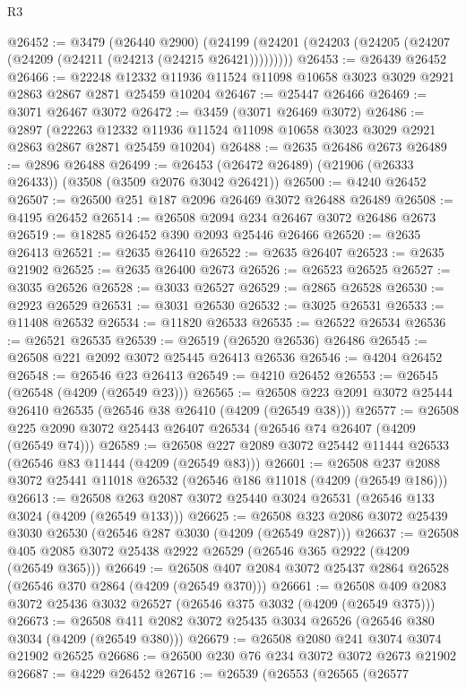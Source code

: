 \begin{lexlean}{R3}
\begin{coremodule}
@26452 := @3479
    (@26440 @2900)
    (@24199 (@24201 (@24203 (@24205 (@24207 (@24209 (@24211 (@24213 (@24215 @26421)))))))))
@26453 := @26439 @26452
@26466 := @22248
    @12332
    @11936
    @11524
    @11098
    @10658
    @3023
    @3029
    @2921
    @2863
    @2867
    @2871
    @25459
    @10204
@26467 := @25447 @26466
@26469 := @3071 @26467 @3072
@26472 := @3459 (@3071 @26469 @3072)
@26486 := @2897
    (@22263 @12332 @11936 @11524 @11098 @10658 @3023 @3029 @2921 @2863 @2867 @2871 @25459 @10204)
@26488 := @2635 @26486 @2673
@26489 := @2896 @26488
@26499 := @26453 (@26472 @26489) (@21906 (@26333 @26433)) (@3508 (@3509 @2076 @3042 @26421))
@26500 := @4240 @26452
@26507 := @26500 @251 @187 @2096 @26469 @3072 @26488 @26489
@26508 := @4195 @26452
@26514 := @26508 @2094 @234 @26467 @3072 @26486 @2673
@26519 := @18285 @26452 @390 @2093 @25446 @26466
@26520 := @2635 @26413
@26521 := @2635 @26410
@26522 := @2635 @26407
@26523 := @2635 @21902
@26525 := @2635 @26400 @2673
@26526 := @26523 @26525
@26527 := @3035 @26526
@26528 := @3033 @26527
@26529 := @2865 @26528
@26530 := @2923 @26529
@26531 := @3031 @26530
@26532 := @3025 @26531
@26533 := @11408 @26532
@26534 := @11820 @26533
@26535 := @26522 @26534
@26536 := @26521 @26535
@26539 := @26519 (@26520 @26536) @26486
@26545 := @26508 @221 @2092 @3072 @25445 @26413 @26536
@26546 := @4204 @26452
@26548 := @26546 @23 @26413
@26549 := @4210 @26452
@26553 := @26545 (@26548 (@4209 (@26549 @23)))
@26565 := @26508 @223 @2091 @3072 @25444 @26410 @26535 (@26546 @38 @26410 (@4209 (@26549 @38)))
@26577 := @26508 @225 @2090 @3072 @25443 @26407 @26534 (@26546 @74 @26407 (@4209 (@26549 @74)))
@26589 := @26508 @227 @2089 @3072 @25442 @11444 @26533 (@26546 @83 @11444 (@4209 (@26549 @83)))
@26601 := @26508 @237 @2088 @3072 @25441 @11018 @26532 (@26546 @186 @11018 (@4209 (@26549 @186)))
@26613 := @26508 @263 @2087 @3072 @25440 @3024 @26531 (@26546 @133 @3024 (@4209 (@26549 @133)))
@26625 := @26508 @323 @2086 @3072 @25439 @3030 @26530 (@26546 @287 @3030 (@4209 (@26549 @287)))
@26637 := @26508 @405 @2085 @3072 @25438 @2922 @26529 (@26546 @365 @2922 (@4209 (@26549 @365)))
@26649 := @26508 @407 @2084 @3072 @25437 @2864 @26528 (@26546 @370 @2864 (@4209 (@26549 @370)))
@26661 := @26508 @409 @2083 @3072 @25436 @3032 @26527 (@26546 @375 @3032 (@4209 (@26549 @375)))
@26673 := @26508 @411 @2082 @3072 @25435 @3034 @26526 (@26546 @380 @3034 (@4209 (@26549 @380)))
@26679 := @26508 @2080 @241 @3074 @3074 @21902 @26525
@26686 := @26500 @230 @76 @234 @3072 @3072 @2673 @21902
@26687 := @4229 @26452
@26716 := @26539
    (@26553
      (@26565
        (@26577

\end{coremodule}
\end{lexlean}
